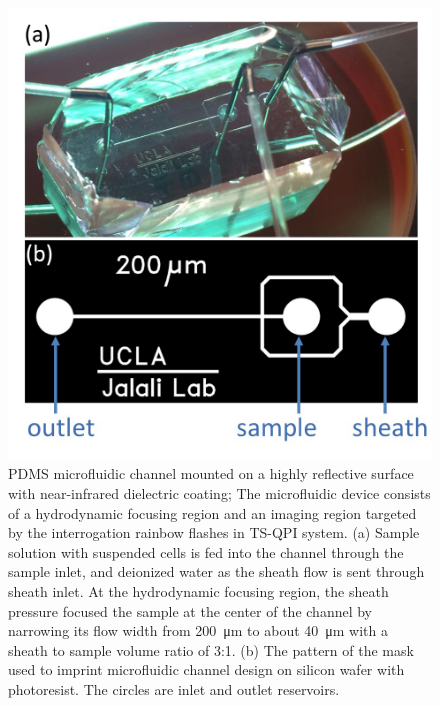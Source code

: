 \documentclass[aps,pra,reprint,groupedaddress]{revtex4-1}
\begin{document}
\begin{figure}[p]
\includegraphics[scale=0.2]{FigureChannel.jpg}
\caption{\label{fig:Channel} PDMS microfluidic channel mounted on a highly reflective surface with near-infrared dielectric coating; The microfluidic device consists of a hydrodynamic focusing region and an imaging region targeted by the interrogation rainbow flashes in TS-QPI system. (a) Sample solution with suspended cells is fed into the channel through the sample inlet, and deionized water as the sheath flow is sent through sheath inlet. At the hydrodynamic focusing region, the sheath pressure focused the sample at the center of the channel by narrowing its flow width from \SI{200}{\micro\meter} to about \SI{40}{\micro\meter} with a sheath to sample volume ratio of 3:1. (b) The pattern of the mask used to imprint microfluidic channel design on silicon wafer with photoresist. The circles are inlet and outlet reservoirs.}
\end{figure}
\end{document}

